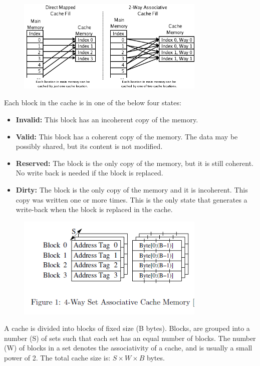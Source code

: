 \documentclass[twocolumn]{IEEEtran}
\begin{document}
\begin{figure}[H]
  \centering
  \includegraphics[width=90mm]{cache}
\end{figure}

Each block in the cache is in one of the below four states:

\begin {itemize}
\item \textbf {Invalid:} This block has an incoherent copy of the memory.
\item \textbf{Valid:} This block has a coherent copy of the memory. The data may be possibly shared, but its content is not modified.
\item \textbf{Reserved:} The block is the only copy of the memory, but it is still coherent. No write back is needed if the block is replaced.
\item \textbf {Dirty:} The block is the only copy of the memory and it is incoherent. This copy was written one or more times. This is the only state that generates a write-back when the block is replaced in the cache.

\end{itemize}


\begin{figure}[H]
  \centering
  \includegraphics[width=90mm]{2}
\end{figure}

 A cache is divided into blocks  of fixed size (B bytes).  Blocks, are grouped into a number (S) of sets such that each set has an equal number of blocks. The number (W) of blocks in a set denotes the associativity of a cache, and is usually a small power
of 2. The total cache size is: $S\times W\times B$  bytes.
\end{document}
